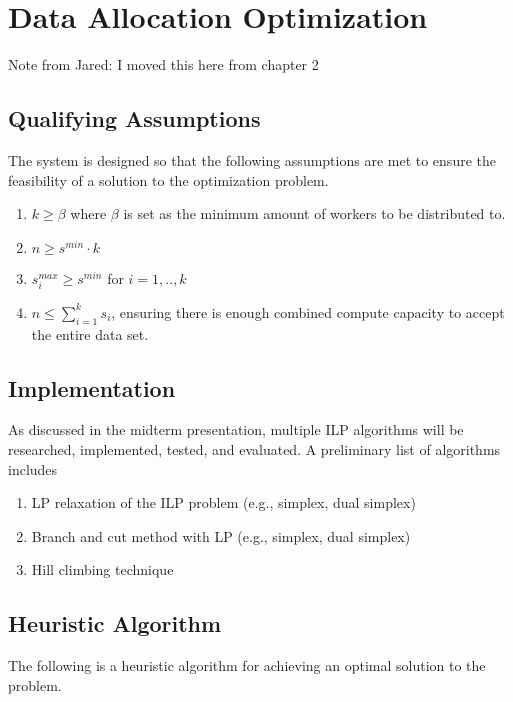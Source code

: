 \documentclass[../mthe-493-final-project.tex]{subfiles}
\begin{document}
    \chapter{Data Allocation Optimization}
    \label{ch:data-allocation-optimization}

    Note from Jared: I moved this here from chapter 2

    \section{Qualifying Assumptions}
    The system is designed so that the following assumptions are met to ensure the feasibility of a solution to the optimization problem.

    \begin{enumerate}
        \item $k \geq \beta$ where $\beta$ is set as the minimum amount of workers to be distributed to.
        \item $n \geq s^{min} \cdot k$
        \item $s_i^{max} \geq s^{min}$ for $i = 1,..,k$
        \item $n \leq \sum_{i=1}^k s_i$, ensuring there is enough combined compute capacity to accept the entire data set.

    \end{enumerate}

    \section{Implementation}

    As discussed in the midterm presentation, multiple ILP algorithms will be researched, implemented, tested, and evaluated. A preliminary list of algorithms includes

    \begin{enumerate}
        \item LP relaxation of the ILP problem (e.g., simplex, dual simplex)
        \item Branch and cut method with LP (e.g., simplex, dual simplex)
        \item Hill climbing technique
    \end{enumerate}

    \section{Heuristic Algorithm}
    The following is a heuristic algorithm for achieving an optimal solution to the problem.
\end{document}
